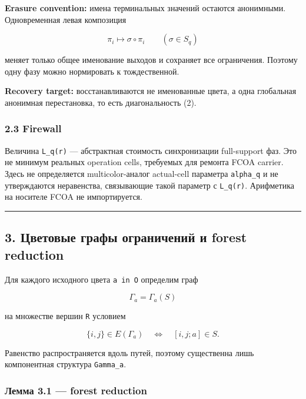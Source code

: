 \textbf{Erasure convention:} имена терминальных значений остаются
анонимными. Одновременная левая композиция

\[
\pi_i\mapsto\sigma\circ\pi_i
\qquad(\sigma\in S_q)
\tag{7}
\]

меняет только общее именование выходов и сохраняет все ограничения.
Поэтому одну фазу можно нормировать к тождественной.

\textbf{Recovery target:} восстанавливаются не именованные цвета, а одна
глобальная анонимная перестановка, то есть диагональность (2).

\hypertarget{firewall}{%
\subsubsection{2.3 Firewall}\label{firewall}}

Величина \texttt{L\_q(r)} --- абстрактная стоимость синхронизации
full-support фаз. Это не минимум реальных operation cells, требуемых для
ремонта FCOA carrier. Здесь не определяется multicolor-аналог
actual-cell параметра \texttt{alpha\_q} и не утверждаются неравенства,
связывающие такой параметр с \texttt{L\_q(r)}. Арифметика на носителе
FCOA не импортируется.

\begin{center}\rule{0.5\linewidth}{0.5pt}\end{center}

\hypertarget{ux446ux432ux435ux442ux43eux432ux44bux435-ux433ux440ux430ux444ux44b-ux43eux433ux440ux430ux43dux438ux447ux435ux43dux438ux439-ux438-forest-reduction}{%
\subsection{3. Цветовые графы ограничений и forest
reduction}\label{ux446ux432ux435ux442ux43eux432ux44bux435-ux433ux440ux430ux444ux44b-ux43eux433ux440ux430ux43dux438ux447ux435ux43dux438ux439-ux438-forest-reduction}}

Для каждого исходного цвета \texttt{a\ in\ O} определим граф

\[
\Gamma_a=\Gamma_a(S)
\]

на множестве вершин \texttt{R} условием

\[
\{i,j\}\in E(\Gamma_a)
\quad\Longleftrightarrow\quad
[i,j;a]\in S.
\tag{8}
\]

Равенство распространяется вдоль путей, поэтому существенна лишь
компонентная структура \texttt{Gamma\_a}.

\hypertarget{ux43bux435ux43cux43cux430-3.1-forest-reduction}{%
\subsubsection{Лемма 3.1 --- forest
reduction}\label{ux43bux435ux43cux43cux430-3.1-forest-reduction}}

